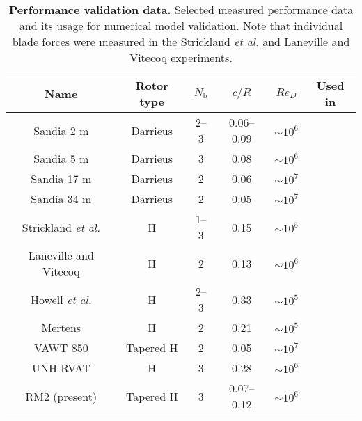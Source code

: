 \begin{table}
    \centering
    
    \begin{tabular}{c|c|c|c|c|c}
        Name & Rotor type & $N_\mathrm{b}$ & $c/R$ & $Re_D$ & Used in \\ 
        \hline
        Sandia 2 m \cite{Blackwell1976} &  Darrieus  & 2--3 & 0.06--0.09 & $\sim 10^6$ & \cite{Roh2013,Bedon2014} \\ 
        Sandia 5 m \cite{Sheldahl1977} &  Darrieus  & 3 & 0.08 & $\sim 10^6$ & \cite{Antheaume2008,Bedon2014} \\ 
        Sandia 17 m \cite{Worstell1978} & Darrieus  & 2 & 0.06 & $\sim 10^7$ & \cite{Para1988,Orlandi2015,Bedon2014} \\ 
        Sandia 34 m \cite{Ashwill1992} & Darrieus  & 2 & 0.05 & $\sim 10^7$ & \cite{Liu1992,Murray2011,Bedon2014}  \\ 
        Strickland \emph{et al.} \cite{Strickland1981} & H & 1--3 & 0.15 & $\sim 10^5$ & \cite{Ponta2001,Scheurich2011b} \\ 
        Laneville and Vitecoq \cite{Laneville1986} & H & 2 & 0.13 & $\sim 10^6$ & \cite{Amet2009} \\ 
        Howell \emph{et al.} \cite{Howell2010} & H & 2--3 & 0.33 & $\sim 10^5$ & \cite{Joo2015} \\ 
        Mertens \cite{Mertens2003} & H & 2 & 0.21 & $\sim 10^5$ & \cite{Orlandi2015} \\ 
        VAWT 850 \cite{Mays1990} & Tapered H & 2 & 0.05 & $\sim 10^7$ & \cite{Murray2011} \\ 
        UNH-RVAT \cite{Bachant2014-RVAT-baseline} & H & 3 & 0.28 & $\sim 10^6$ & \cite{Michelen2014} \\
        RM2 (present) & Tapered H & 3 & 0.07--0.12 & $\sim 10^6$ & 
    \end{tabular}     
    
    \caption{\textbf{Performance validation data.} Selected measured performance
        data and its usage for numerical model validation. Note that individual
        blade forces were measured in the Strickland \emph{et al.} and Laneville and
        Vitecoq experiments.}
    
    \label{tab:validation-data}
\end{table}

